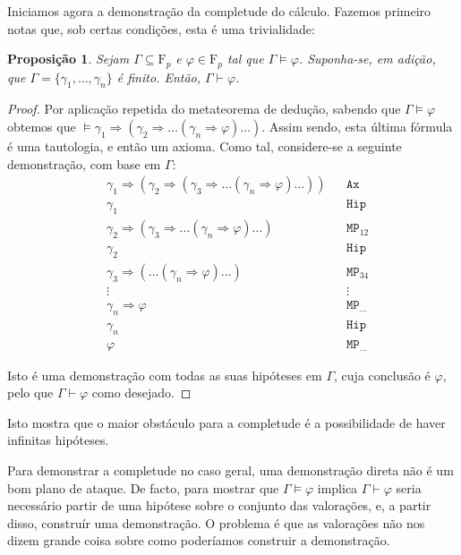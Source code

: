 \documentclass{report}
\newtheorem{prop}{Proposição}
\theoremstyle{definition}
\theoremstyle{remark}
\newcommand{\F}{\mathrm{F}}
\newcommand{\imply}{\mathbin{\Rightarrow}}
\begin{document}
	Iniciamos agora a demonstração da completude do cálculo. Fazemos primeiro notas que, sob certas condições, esta é uma trivialidade:
	
	\begin{prop}
	Sejam $\Gamma \subseteq \F_p$ e $\varphi \in \F_p$ tal que $\Gamma \vDash \varphi$. Suponha-se, em adição, que $\Gamma = \{\gamma_1, \dots, \gamma_n\}$ é finito. Então, $\Gamma \vdash \varphi$.
	\end{prop}
	
	\begin{proof}
	Por aplicação repetida do metateorema de dedução, sabendo que $\Gamma \vDash \varphi$ obtemos que $\vDash \gamma_1 \imply (\gamma_2 \imply \dots (\gamma_n \imply \varphi) \dots )$. Assim sendo, esta última fórmula é uma tautologia, e então um axioma. Como tal, considere-se a seguinte demonstração, com base em $\Gamma$:
	\begin{align*}
	&\gamma_1 \imply (\gamma_2 \imply (\gamma_3 \imply \dots (\gamma_n \imply \varphi) \dots )) &&\texttt{Ax}\\
	&\gamma_1 &&\texttt{Hip}\\
	&\gamma_2 \imply (\gamma_3 \imply \dots (\gamma_n \imply \varphi) \dots ) &&\texttt{MP}_{12}\\
	&\gamma_2 &&\texttt{Hip}\\
	&\gamma_3 \imply ( \dots (\gamma_n \imply \varphi) \dots)  &&\texttt{MP}_{34}\\
	&\vdots&&\vdots\\
	&\gamma_n \imply \varphi &&\texttt{MP}_{\dots}\\
	&\gamma_n &&\texttt{Hip}\\
	&\varphi &&\texttt{MP}_{\dots}
	\end{align*}
	
	Isto é uma demonstração com todas as suas hipóteses em $\Gamma$, cuja conclusão é $\varphi$, pelo que $\Gamma \vdash \varphi$ como desejado.
	\end{proof}
	
	Isto mostra que o maior obstáculo para a completude é a possibilidade de haver infinitas hipóteses.
	
	Para demonstrar a completude no caso geral, uma demonstração direta não é um bom plano de ataque. De facto, para mostrar que $\Gamma \vDash \varphi$ implica $\Gamma \vdash \varphi$ seria necessário partir de uma hipótese sobre o conjunto das valorações, e, a partir disso, construír uma demonstração. O problema é que as valorações não nos dizem grande coisa sobre como poderíamos construir a demonstração.
	
\end{document}
